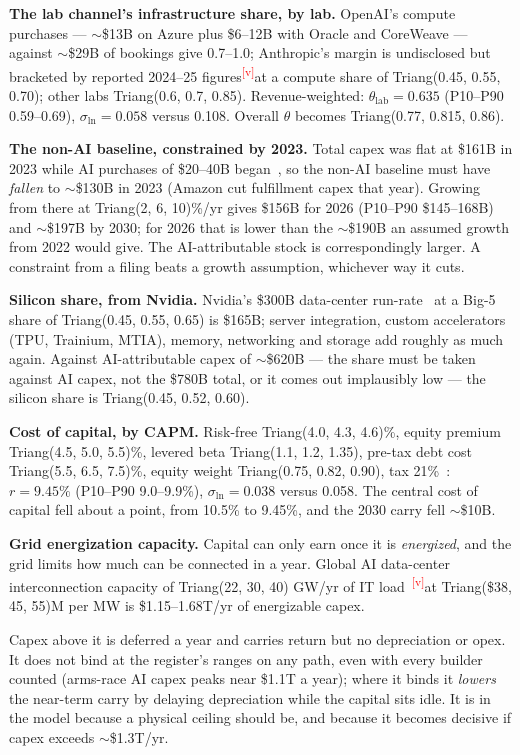 \documentclass[11pt,letterpaper]{article}
\newcommand{\verify}{\textsuperscript{\textcolor{red}{[v]}}}
\newcommand{\lead}[1]{{\color{leadwarm}\sffamily\bfseries #1}}
\begin{document}
\lead{The lab channel's infrastructure share, by lab.} OpenAI's compute purchases --- $\sim$\$13B on Azure plus \$6--12B with Oracle and CoreWeave --- against $\sim$\$29B of bookings give 0.7--1.0; Anthropic's margin is undisclosed but bracketed by reported 2024--25 figures\verify at a compute share of Triang(0.45, 0.55, 0.70); other labs Triang(0.6, 0.7, 0.85). Revenue-weighted: $\theta_{\text{lab}}=0.635$ (P10--P90 0.59--0.69), $\sigma_{\ln}=0.058$ versus 0.108. Overall $\theta$ becomes Triang(0.77, 0.815, 0.86).

\lead{The non-AI baseline, constrained by 2023.} Total capex was flat at \$161B in 2023 while AI purchases of \$20--40B began~\cite{ref:epoch_capex}, so the non-AI baseline must have \emph{fallen} to $\sim$\$130B in 2023 (Amazon cut fulfillment capex that year). Growing from there at Triang(2, 6, 10)\%/yr gives \$156B for 2026 (P10--P90 \$145--168B) and $\sim$\$197B by 2030; for 2026 that is lower than the $\sim$\$190B an assumed growth from 2022 would give. The AI-attributable stock is correspondingly larger. A constraint from a filing beats a growth assumption, whichever way it cuts.

\lead{Silicon share, from Nvidia.} Nvidia's \$300B data-center run-rate~\cite{ref:nvda_q1fy27} at a Big-5 share of Triang(0.45, 0.55, 0.65) is \$165B; server integration, custom accelerators (TPU, Trainium, MTIA), memory, networking and storage add roughly as much again. Against AI-attributable capex of $\sim$\$620B --- the share must be taken against AI capex, not the \$780B total, or it comes out implausibly low --- the silicon share is Triang(0.45, 0.52, 0.60).

\lead{Cost of capital, by CAPM.} Risk-free Triang(4.0, 4.3, 4.6)\%, equity premium Triang(4.5, 5.0, 5.5)\%, levered beta Triang(1.1, 1.2, 1.35), pre-tax debt cost Triang(5.5, 6.5, 7.5)\%, equity weight Triang(0.75, 0.82, 0.90), tax 21\%~\cite{ref:damodaran2026}: $r=9.45\%$ (P10--P90 9.0--9.9\%), $\sigma_{\ln}=0.038$ versus 0.058. The central cost of capital fell about a point, from 10.5\% to 9.45\%, and the 2030 carry fell $\sim$\$10B.

\lead{Grid energization capacity.} Capital can only earn once it is \emph{energized}, and the grid limits how much can be connected in a year. Global AI data-center interconnection capacity of Triang(22, 30, 40) GW/yr of IT load~\cite{ref:pjm_queue,ref:eirgrid_cru}\verify at Triang(\$38, 45, 55)M per MW is \$1.15--1.68T/yr of energizable capex.

Capex above it is deferred a year and carries return but no depreciation or opex. It does not bind at the register's ranges on any path, even with every builder counted (arms-race AI capex peaks near \$1.1T a year); where it binds it \emph{lowers} the near-term carry by delaying depreciation while the capital sits idle. It is in the model because a physical ceiling should be, and because it becomes decisive if capex exceeds $\sim$\$1.3T/yr.
\end{document}
